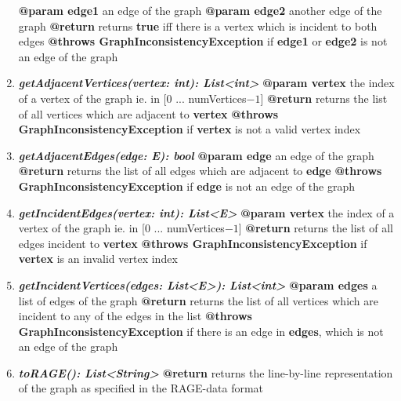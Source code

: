 \documentclass{article}
\begin{document}
\begin{enumerate}[+]
{			\textbf{@param edge1} an edge of the graph \newline
			\textbf{@param edge2} another edge of the graph \newline
			\textbf{@return} returns \textbf{true} iff there is a vertex which is incident to both edges \newline
			\textbf{@throws GraphInconsistencyException} if \textbf{edge1} or \textbf{edge2} is not an edge of the graph
		}
		\item{
			\textbf{\textit{getAdjacentVertices(vertex: int): List<int>}} \newline
			\textbf{@param vertex} the index of a vertex of the graph ie. in [0 ... numVertices$-1$] \newline
			\textbf{@return} returns the list of all vertices which are adjacent to \textbf{vertex} \newline
			\textbf{@throws GraphInconsistencyException} if \textbf{vertex} is not a valid vertex index
		}
		\item{
			\textbf{\textit{getAdjacentEdges(edge: E): bool}} \newline
			\textbf{@param edge} an edge of the graph \newline
			\textbf{@return} returns the list of all edges which are adjacent to \textbf{edge} \newline
			\textbf{@throws GraphInconsistencyException} if \textbf{edge} is not an edge of the graph
		}
		\item{
			\textbf{\textit{getIncidentEdges(vertex: int): List<E>}} \newline
			\textbf{@param vertex} the index of a vertex of the graph ie. in [0 ... numVertices$-1$] \newline
			\textbf{@return} returns the list of all edges incident to \textbf{vertex} \newline
			\textbf{@throws GraphInconsistencyException} if \textbf{vertex} is an invalid vertex index
		}
		\item{
			\textbf{\textit{getIncidentVertices(edges: List<E>): List<int>}} \newline
			\textbf{@param edges} a list of edges of the graph \newline
			\textbf{@return} returns the list of all vertices which are incident to any of the edges in the list \newline
			\textbf{@throws GraphInconsistencyException} if there is an edge in \textbf{edges}, which is not an edge of the graph
			
		}
		\item{
			\textbf{\textit{toRAGE(): List<String>}} \newline
			\textbf{@return} returns the line-by-line representation of the graph as specified in the RAGE-data format
		}
	\end{enumerate}
	
\end{document}
